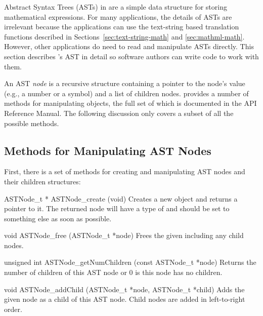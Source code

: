\documentclass{sbmlmanual}
\begin{document}
Abstract Syntax Trees (ASTs) in \libsbml{} are a simple data structure for
storing mathematical expressions.  For many applications, the details of
ASTs are irrelevant because the applications can use the text-string based
translation functions described in Sections~\ref{sec:text-string-math} and
\ref{sec:mathml-math}.  However, other applications do need to read and
manipulate ASTs directly.  This section describes \libsbml{}'s AST in
detail so software authors can write code to work with them.

An AST \emph{node} is a recursive structure containing a pointer to the
node's value (e.g., a number or a symbol) and a list of children nodes.
\libsbml{} provides a number of methods for manipulating 
objects, the full set of which is documented in the \libsbml{} API
Reference Manual.   The following discussion only covers a subset of all
the possible methods.


\subsection{Methods for Manipulating AST Nodes}

First, there is a set of methods for creating and manipulating \libsbml{}
AST nodes and their children structures:

\begin{methoddef}{ASTNode\_t * ASTNode\_create (void)}
  Creates a new  object and returns a pointer to it.  The
  returned node will have a type of  and should be set
  to something else as soon as possible.
\end{methoddef}


\begin{methoddef}{void ASTNode\_free (ASTNode\_t *node)}
  Frees the given  including any child nodes.
\end{methoddef}


\begin{methoddef}{unsigned int ASTNode\_getNumChildren (const ASTNode\_t *node)}
  Returns the number of children of this AST node or 0 is this node has no
  children.
\end{methoddef}


\begin{methoddef}{void ASTNode\_addChild (ASTNode\_t *node, ASTNode\_t *child)}
  Adds the given node as a child of this AST node.  Child nodes are added
  in left-to-right order.
\end{methoddef}
\end{document}
